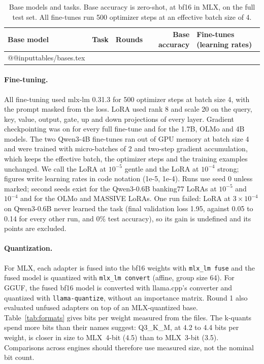 \documentclass[11pt,letterpaper]{article}
\makeatletter
\newcommand*{\tablerows}[1]{\csname @@input\endcsname #1 }
\makeatother
\begin{document}
\begin{table}[htbp]
\centering\small
\caption{Base models and tasks. Base accuracy is zero-shot, at bf16 in MLX, on the full test set. All fine-tunes run 500 optimizer steps at an effective batch size of 4.}
\label{tab:bases}
\begin{tabularx}{\linewidth}{llcrL}
\toprule
Base model & Task & Rounds & Base accuracy & Fine-tunes (learning rates) \\
\midrule
\tablerows{tables/bases.tex}
\bottomrule
\end{tabularx}
\end{table}

\paragraph{Fine-tuning.} All fine-tuning used mlx-lm 0.31.3 for 500 optimizer steps at batch size 4, with the prompt masked from the loss. LoRA used rank 8 and scale 20 on the query, key, value, output, gate, up and down projections of every layer. Gradient checkpointing was on for every full fine-tune and for the 1.7B, OLMo and 4B models. The two Qwen3-4B fine-tunes ran out of GPU memory at batch size 4 and were trained with micro-batches of 2 and two-step gradient accumulation, which keeps the effective batch, the optimizer steps and the training examples unchanged. We call the LoRA at $10^{-5}$ gentle and the LoRA at $10^{-4}$ strong; figures write learning rates in code notation (1e-5, 1e-4). Runs use seed 0 unless marked; second seeds exist for the Qwen3-0.6B banking77 LoRAs at $10^{-5}$ and $10^{-4}$ and for the OLMo and MASSIVE LoRAs. One run failed: LoRA at $3\times10^{-4}$ on Qwen3-0.6B never learned the task (final validation loss 1.95, against 0.05 to 0.14 for every other run, and 0\% test accuracy), so its gain is undefined and its points are excluded.

\paragraph{Quantization.} For MLX, each adapter is fused into the bf16 weights with \texttt{mlx\_lm fuse} and the fused model is quantized with \texttt{mlx\_lm convert} (affine, group size 64). For GGUF, the fused bf16 model is converted with llama.cpp's converter and quantized with \texttt{llama-quantize}, without an importance matrix. Round 1 also evaluated unfused adapters on top of an MLX-quantized base. Table~\ref{tab:formats} gives bits per weight measured from the files. The k-quants spend more bits than their names suggest: Q3\_K\_M, at 4.2 to 4.4 bits per weight, is closer in size to MLX~4-bit (4.5) than to MLX~3-bit (3.5). Comparisons across engines should therefore use measured size, not the nominal bit count.
\end{document}
